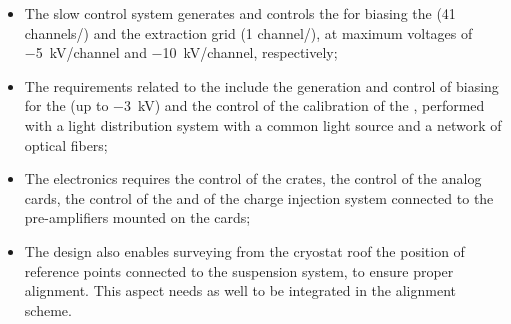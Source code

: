 \begin{itemize}
\item The slow control system generates and controls the  for biasing the  (\num{41} channels/) and the extraction grid  (\num{1} channel/), at maximum voltages of  \SI{-5}{kV/channel} and \SI{-10}{kV/channel}, respectively;
\item The requirements related to the  include the generation and control of  biasing for the  (up to \SI{-3}{kV}) and the control of the calibration of the  ,  performed with a  light distribution system with a common light source and a network of optical fibers;
\item The  electronics requires the control of the  crates, the control of the  analog  cards, the control of the  and of the charge injection system connected to the pre-amplifiers mounted on the  cards;
\item The \dual design also enables surveying from the cryostat roof the position of reference points connected to the  suspension system, to ensure proper  alignment. This aspect needs as well to be integrated in the alignment scheme. 
\end{itemize}



